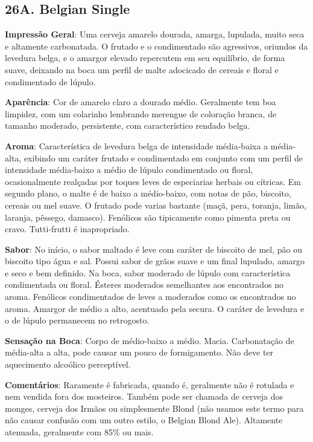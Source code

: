 \subsection*{26A. Belgian Single}

\textbf{Impressão Geral}: Uma cerveja amarelo dourada, amarga, lupulada, muito seca e altamente carbonatada. O frutado e o condimentado são agressivos, oriundos da levedura belga, e o amargor elevado repercutem em seu equilíbrio, de forma suave, deixando na boca um perfil de malte adocicado de cereais e floral e condimentado de lúpulo.

\textbf{Aparência}: Cor de amarelo claro a dourado médio. Geralmente tem boa limpidez, com um colarinho lembrando merengue de coloração branca, de tamanho moderado, persistente, com característico rendado belga.

\textbf{Aroma}: Característica de levedura belga de intensidade média-baixa a média-alta, exibindo um caráter frutado e condimentado em conjunto com um perfil de intensidade média-baixo a médio de lúpulo condimentado ou floral, ocasionalmente realçadas por toques leves de especiarias herbais ou cítricas. Em segundo plano, o malte é de baixo a médio-baixo, com notas de pão, biscoito, cereais ou mel suave. O frutado pode varias bastante (maçã, pera, toranja, limão, laranja, pêssego, damasco). Fenólicos são tipicamente como pimenta preta ou cravo. Tutti-frutti é inapropriado.

\textbf{Sabor}: No início, o sabor maltado é leve com caráter de biscoito de mel, pão ou biscoito tipo água e sal. Possui sabor de grãos suave e um final lupulado, amargo e seco e bem definido. Na boca, sabor moderado de lúpulo com característica condimentada ou floral. Ésteres moderados semelhantes aos encontrados no aroma. Fenólicos condimentados de leves a moderados como os encontrados no aroma. Amargor de médio a alto, acentuado pela secura. O caráter de levedura e o de lúpulo permanecem no retrogosto.

\textbf{Sensação na Boca}: Corpo de médio-baixo a médio. Macia. Carbonatação de média-alta a alta, pode causar um pouco de formigamento. Não deve ter aquecimento alcoólico perceptível.

\textbf{Comentários}: Raramente é fabricada, quando é, geralmente não é rotulada e nem vendida fora dos mosteiros. Também pode ser chamada de cerveja dos monges, cerveja dos Irmãos ou simplesmente Blond (não usamos este termo para não causar confusão com um outro estilo, o Belgian Blond Ale). Altamente atenuada, geralmente com 85\% ou mais.

